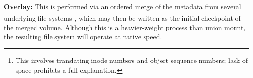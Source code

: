 \noindent \textbf{Overlay:} This is performed via an ordered merge of the metadata from several underlying file systems\footnote{This involves translating inode numbers and object sequence numbers; lack of space prohibits a full explanation.}, which may then be written as the initial checkpoint of the merged volume.
Although this is a heavier-weight process than union mount, the resulting file system will operate at native speed.

